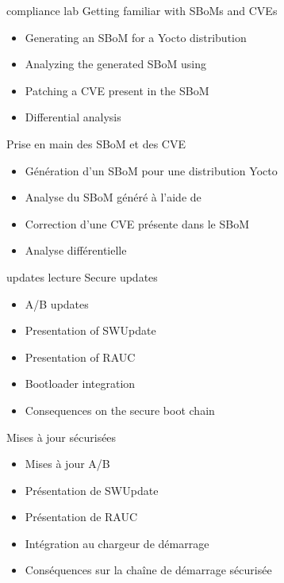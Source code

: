 {compliance}
{lab}
{Getting familiar with SBoMs and CVEs}
{
  \begin{itemize}
  \item Generating an SBoM for a Yocto distribution
  \item Analyzing the generated SBoM using 
  \item Patching a CVE present in the SBoM
  \item Differential analysis
  \end{itemize}
}
{Prise en main des SBoM et des CVE}
{
  \begin{itemize}
  \item Génération d’un SBoM pour une distribution Yocto
  \item Analyse du SBoM généré à l’aide de 
  \item Correction d’une CVE présente dans le SBoM
  \item Analyse différentielle
  \end{itemize}
}
{updates}
{lecture}
{Secure updates}
{
  \begin{itemize}
  \item A/B updates
  \item Presentation of SWUpdate
  \item Presentation of RAUC
  \item Bootloader integration
  \item Consequences on the secure boot chain
  \end{itemize}
}
{Mises à jour sécurisées}
{
  \begin{itemize}
  \item Mises à jour A/B
  \item Présentation de SWUpdate
  \item Présentation de RAUC
  \item Intégration au chargeur de démarrage
  \item Conséquences sur la chaîne de démarrage sécurisée
  \end{itemize}
}

